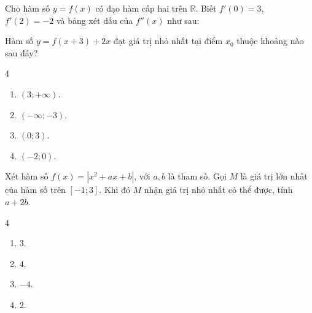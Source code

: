 \begin{baitap}
	Cho hàm số $y = f(x)$ có đạo hàm cấp hai trên $\mathbb{R}$. Biết $f'(0) = 3$, $f'(2) = -2$ và bảng xét dấu của $f''(x)$ như sau:
	\begin{center}
	\end{center}
	
	Hàm số $y = f(x + 3) + 2x$ đạt giá trị nhỏ nhất tại điểm $x_0$ thuộc khoảng nào sau đây?
	\begin{multicols}{4}
		\begin{enumerate}[\quad \bf A.]
			\item $(3; +\infty)$.
			\item $(-\infty; -3)$.
			\item $(0; 3)$.
			\item $(-2; 0)$.
		\end{enumerate}
	\end{multicols}
\end{baitap}

\begin{baitap}
	Xét hàm số $f(x) = |x^2 + ax + b|$, với $a, b$ là tham số. Gọi $M$ là giá trị lớn nhất của hàm số trên $[-1; 3]$. Khi đó $M$ nhận giá trị nhỏ nhất có thể được, tính $a + 2b$.
	\begin{multicols}{4}
		\begin{enumerate}[\quad \bf A.]
			\item $3$.
			\item $4$.
			\item $-4$.
			\item $2$.
		\end{enumerate}
	\end{multicols}
\end{baitap}
